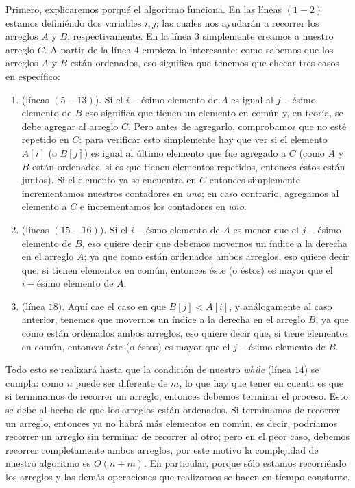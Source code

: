 \documentclass[letterpaper,11pt]{article}
\begin{document}
\begin{enumerate}
    Primero, explicaremos porqué el algoritmo funciona. En las líneas $(1 - 2)$ 
    estamos definiéndo dos variables $i, j$; las cuales nos ayudarán a recorrer
    los arreglos $A$ y $B$, respectivamente. En la línea $3$ simplemente creamos 
    a nuestro arreglo $C$. A partir de la línea $4$ empieza lo interesante: como
    sabemos que los arreglos $A$ y $B$ están ordenados, eso significa que 
    tenemos que checar tres casos en específico:
    \begin{enumerate}
        \item (líneas $(5 - 13)$). Si el $i-$ésimo elemento de $A$ es igual al 
        $j-$ésimo elemento de $B$ eso significa que tienen un elemento en común 
        y, en teoría, se debe agregar al arreglo $C$. Pero antes de agregarlo,
        comprobamos que no esté repetido en $C$: para verificar esto simplemente
        hay que ver si el elemento $A[i]$ (o $B[j]$) es igual al último elemento 
        que fue agregado a $C$ (como $A$ y $B$ están ordenados, si es que tienen 
        elementos repetidos, entonces éstos están juntos). Si el elemento ya se 
        encuentra en $C$ entonces simplemente incrementamos nuestros contadores 
        en \textit{uno}; en caso contrario, agregamos al elemento a $C$ e 
        incrementamos los contadores en \textit{uno}.

        \item (líneas $(15 - 16)$). Si el $i-$ésmo elemento de $A$ es menor que 
        el $j-$ésimo elemento de $B$, eso quiere decir que debemos movernos un 
        índice a la derecha en el arreglo $A$; ya que como están ordenados ambos 
        arreglos, eso quiere decir que, si tienen elementos en común, entonces 
        éste (o éstos) es mayor que el $i-$ésimo elemento de $A$.

        \item (línea $18$). Aquí cae el caso en que $B[j] < A[i]$, y 
        análogamente al caso anterior, tenemos que movernos un índice a la 
        derecha en el arreglo $B$; ya que como están ordenados ambos arreglos, 
        eso quiere decir que, si tiene elementos en común, entonces éste (o 
        éstos) es mayor que el $j-$ésimo elemento de $B$. 
    \end{enumerate} 

    Todo esto se realizará hasta que la condición de nuestro \textit{while} 
    (línea $14$) se cumpla: como $n$ puede ser diferente de $m$,
     lo que hay 
    que tener en cuenta es que si terminamos de recorrer un arreglo, entonces 
    debemos terminar el proceso. Esto se debe al hecho de que los arreglos
    están ordenados. Si terminamos de recorrer un arreglo, entonces ya no 
    habrá más elementos en común, es decir, podríamos recorrer un arreglo sin 
    terminar de recorrer al otro; pero en el peor caso, debemos recorrer 
    completamente ambos arreglos, por este motivo la complejidad de nuestro 
    algoritmo es $O(n + m)$. En particular, porque sólo estamos recorriéndo los 
    arreglos y las demás operaciones que realizamos se hacen en tiempo constante.


\end{enumerate}
\end{document}
